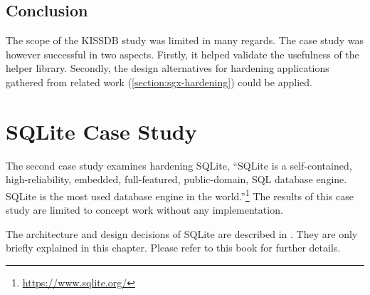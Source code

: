 \section{Conclusion\label{ID_1103257591}}
The scope of the KISSDB study was limited in many regards.\label{ID_820238916}
The case study was however successful in two aspects.\label{ID_1898934983}
Firstly, it helped validate the usefulness of the helper library.\label{ID_1726616737}
Secondly, the design alternatives for hardening applications gathered from related work (\autoref{section:sgx-hardening}) could be applied.\label{ID_1657278492}

\chapter{SQLite Case Study\label{ID_650094352}\label{chapter:sqlite}}
The second case study examines hardening SQLite, ``SQLite is a self-contained, high-reliability, embedded, full-featured, public-domain, SQL database engine. SQLite is the most used database engine in the world.''\footnote{\url{https://www.sqlite.org/}}\label{ID_524579169}
The results of this case study are limited to concept work without any implementation.\label{ID_1099628668}

The architecture and design decisions of SQLite are described in \cite{Haldar2015}.\label{ID_562215635}
They are only briefly explained in this chapter. Please refer to this book for further details.\label{ID_1054268001}

